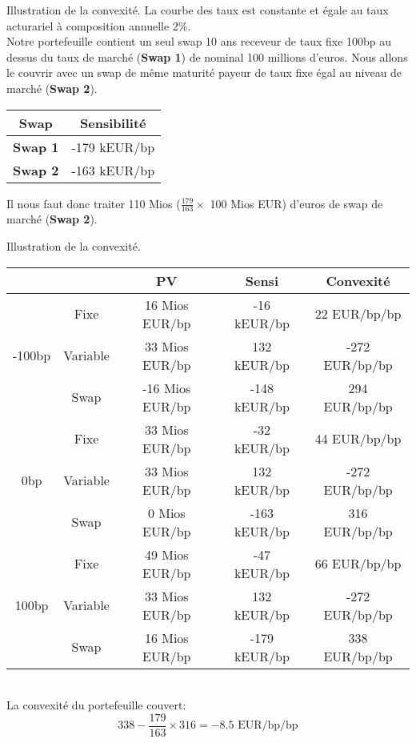 \documentclass{beamer}
\begin{document}
\begin{frame}{Illustration de la convexité.}
La courbe des taux est constante et égale au taux acturariel à composition annuelle 2\%.\\
\vspace{0.5cm}
Notre portefeuille contient un seul swap 10 ans receveur de taux fixe 100bp au dessus du taux de marché (\textbf{Swap 1}) de nominal 100 millions d'euros. Nous allons le couvrir avec un swap de même maturité payeur de taux fixe égal au niveau de marché (\textbf{Swap 2}).\\
\begin{center}
\begin{tabular}{|c|c|}
\hline
Swap&Sensibilité \\ 
\hline
\textbf{Swap 1} &-179 kEUR/bp \\ 
\textbf{Swap 2} &-163 kEUR/bp \\ 
\hline
\end{tabular}
\end{center}
Il nous faut donc traiter 110 Mios ($\frac{179}{163} \times$ 100 Mios EUR)  d'euros de swap de marché (\textbf{Swap 2}).
\end{frame}

\begin{frame}{Illustration de la convexité.}
\small
\begin{tabular}{|c|c|c|c|c|}
\hline
&&PV&Sensi&Convexité  \\ 
\hline
\multirow{3}{*}{-100bp}&Fixe& 16 Mios EUR/bp &  -16 kEUR/bp & 22 EUR/bp/bp \\ 
&Variable& 33 Mios EUR/bp & 132 kEUR/bp & -272 EUR/bp/bp \\ 
&Swap& -16 Mios EUR/bp & -148 kEUR/bp & 294 EUR/bp/bp \\ 
\hline
\multirow{3}{*}{0bp}&Fixe& 33 Mios EUR/bp &  -32 kEUR/bp & 44 EUR/bp/bp \\ 
&Variable& 33 Mios EUR/bp & 132 kEUR/bp & -272 EUR/bp/bp \\ 
&Swap& 0 Mios EUR/bp & -163 kEUR/bp & 316 EUR/bp/bp \\ 
\hline
\multirow{3}{*}{100bp}&Fixe& 49 Mios EUR/bp &  -47 kEUR/bp & 66 EUR/bp/bp \\ 
&Variable& 33 Mios EUR/bp & 132 kEUR/bp & -272 EUR/bp/bp \\ 
&Swap& 16 Mios EUR/bp & -179 kEUR/bp & 338 EUR/bp/bp \\ 
\hline
\end{tabular}\\
\normalsize
\vspace{0.5cm}
La convexité du portefeuille couvert:
\[
338 - \frac{179}{163} \times 316 = -8.5\text{ EUR/bp/bp}
\]
\end{frame}
\end{document}
